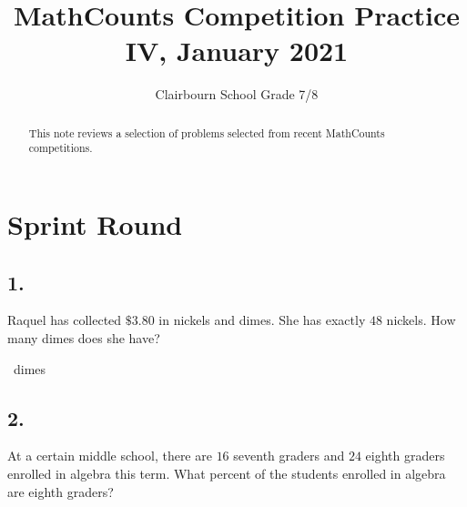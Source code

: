 \documentclass[12pt]{article}
\title{MathCounts Competition Practice IV, January 2021}
\author{Clairbourn School Grade 7/8}
\newenvironment{answer}{\vspace{1em}}{}
\newenvironment{answer}{\vspace{0em}\expandafter\comment}{\expandafter\endcomment}
\newlength{\currentparskip}
\newlength{\currentparindent}
\newenvironment{minipagex}[2][]
  {\setlength{\currentparskip}{\parskip}%
    \setlength{\currentparindent}{\parindent}%
   \begin{minipage}[#1]{#2}%
   \setlength{\parskip}{\currentparskip}%
   \setlength{\parindent}{\currentparindent}%
  }
  {\end{minipage}}
\begin{document}
\maketitle
\begin{minipage}{\textwidth}
\maketitle
\begin{abstract}
This note reviews a selection of problems selected from recent MathCounts competitions.
\end{abstract}
\end{minipage}

\newpage
\section*{Sprint Round}


\subsection*{1.}
Raquel has collected $\$3.80$ in nickels and dimes. She has exactly $48$ nickels. How many dimes does she have?

\fbox{\phantom{ANSWER}}~dimes

\begin{answer}
%
\end{answer}


\subsection*{2.}
At a certain middle school, there are $16$ seventh graders and $24$ eighth graders enrolled in algebra this term. What percent of the students enrolled in algebra are eighth graders?
\end{document}
